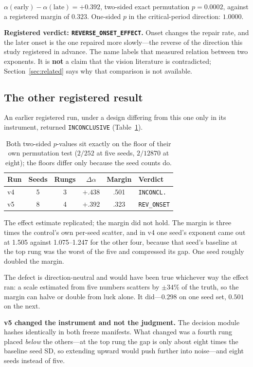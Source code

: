 \documentclass[11pt]{article}
\newcommand{\cond}[1]{\texttt{#1}}
\begin{document}
$\alpha(\text{early}) - \alpha(\text{late}) = +0.392$, two-sided exact
permutation $p = 0.0002$, against a registered margin of $0.323$. One-sided $p$
in the critical-period direction: $1.0000$.

\textbf{Registered verdict: \cond{REVERSE\_ONSET\_EFFECT}.} Onset changes the
repair rate, and the later onset is the one repaired more slowly---the reverse of
the direction this study registered in advance. The name labels that measured
relation between two exponents. It is \textbf{not} a claim that the vision
literature is contradicted; Section~\ref{sec:related} says why that comparison is
not available.

\subsection{The other registered result}

An earlier registered run, under a design differing from this one only in its
instrument, returned \cond{INCONCLUSIVE} (Table~\ref{tab:v4v5}).

\begin{table}[t]
\centering\small
\begin{tabular}{lccccl}
\toprule
Run & Seeds & Rungs & $\Delta\alpha$ & Margin & Verdict \\
\midrule
v4 & 5 & 3 & $+.438$ & .501 & \cond{INCONCL.} \\
v5 & 8 & 4 & $+.392$ & .323 & \cond{REV\_ONSET} \\
\bottomrule
\end{tabular}
\caption{Both two-sided $p$-values sit exactly on the floor of their own
permutation test ($2/252$ at five seeds, $2/12870$ at eight); the floors differ
only because the seed counts do.}
\label{tab:v4v5}
\end{table}

The effect estimate replicated; the margin did not hold. The margin is three
times the control's own per-seed scatter, and in v4 one seed's exponent came out
at 1.505 against 1.075--1.247 for the other four, because that seed's baseline at
the top rung was the worst of the five and compressed its gap. One seed roughly
doubled the margin.

The defect is direction-neutral and would have been true whichever way the effect
ran: a scale estimated from five numbers scatters by $\pm34\%$ of the truth, so
the margin can halve or double from luck alone. It did---$0.298$ on one seed set,
$0.501$ on the next.

\textbf{v5 changed the instrument and not the judgment.} The decision module
hashes identically in both freeze manifests. What changed was a fourth rung
placed \emph{below} the others---at the top rung the gap is only about eight times
the baseline seed SD, so extending upward would push further into noise---and
eight seeds instead of five.
\end{document}
